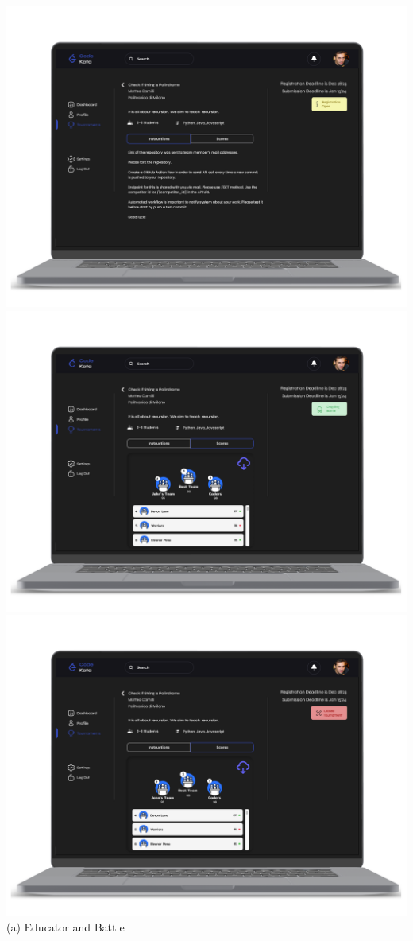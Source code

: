 \begin{center}
\includegraphics[scale=0.13]{Images/ui-ux/educator_battle/educator_battle_1.png}
\includegraphics[scale=0.13]{Images/ui-ux/educator_battle/educator_battle_2.png}
\includegraphics[scale=0.13]{Images/ui-ux/educator_battle/educator_battle_3.png}
 \\(a) Educator and Battle
\end{center}
